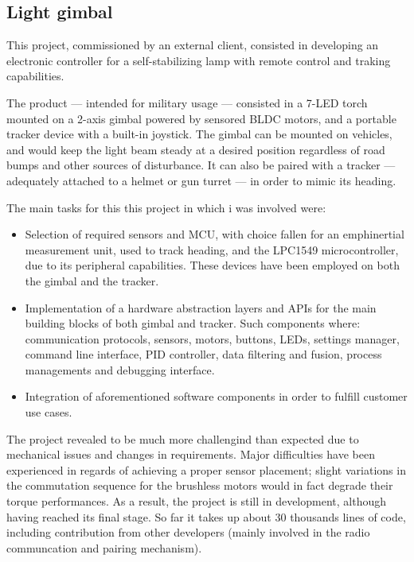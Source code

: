 \subsection{Light gimbal}
This project, commissioned by an external client, consisted in developing an electronic controller for a self-stabilizing lamp with remote control and traking capabilities.

The product --- intended for military usage --- consisted in a 7-LED torch mounted on a 2-axis gimbal powered by sensored BLDC motors, and a portable tracker device with a built-in joystick. 
The gimbal can be mounted on vehicles, and would keep the light beam steady at a desired position regardless of road bumps and other sources of disturbance.
It can also be paired with a tracker --- adequately attached to a helmet or gun turret --- in order to mimic its heading.

The main tasks for this this project in which i was involved were:
\begin{itemize}  
\item Selection of required sensors and MCU, with choice fallen for an emph{inertial measurement unit}, used to track heading, and the LPC1549 microcontroller, due to its peripheral capabilities. These devices have been employed on both the gimbal and the tracker.
\item Implementation of a hardware abstraction layers and APIs for the main building blocks of both gimbal and tracker. Such components where: communication protocols, sensors, motors, buttons, LEDs, settings manager, command line interface, PID controller, data filtering and fusion, process managements and debugging interface.
\item Integration of aforementioned software components in order to fulfill customer use cases.
\end{itemize}

The project revealed to be much more challengind than expected due to mechanical issues and changes in requirements. 
Major difficulties have been experienced in regards of achieving a proper sensor placement; slight variations in the commutation sequence for the brushless motors would in fact degrade their torque performances.
As a result, the project is still in development, although having reached its final stage.
So far it takes up about 30 thousands lines of code, including contribution from other developers (mainly involved in the radio communcation and pairing mechanism).
